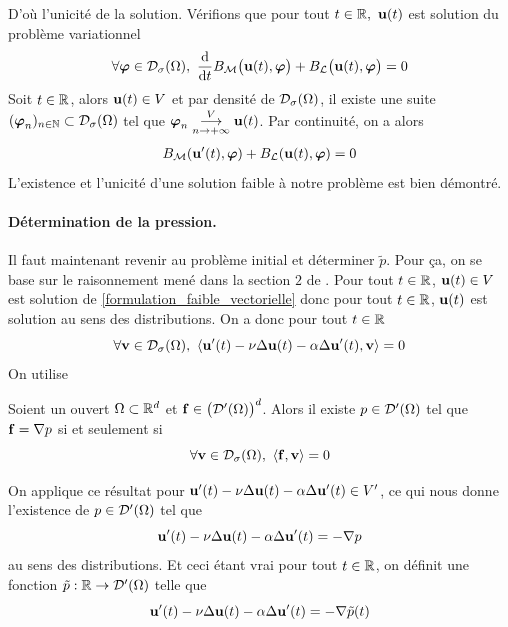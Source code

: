 D'où l'unicité de la solution. Vérifions que pour tout $t \in \mathbb{R},\ \bm{\mathrm{u}}(t)$ est solution du problème variationnel
\begin{eqnarray*}
    \forall \bfm{\varphi} \in \calD_{\sigma}(\Omega),\ \frac{\mathrm{d}}{\mathrm{d}t}B_{\calM}\big(\bfm{u}(t),\bfm{\varphi}\big) + B_{\calL}\big(\bfm{u}(t),\bfm{\varphi}\big) = 0
\end{eqnarray*}
Soit $t\in\mathbb{R}$, alors $\bm{\mathrm{u}}(t) \in V$ et par densité de $\mathcal{D}_{\sigma}(\Omega)$, il existe une suite $(\bm{\mathrm{\varphi}}_n)_{n\in \mathbb{N}} \subset \mathcal{D}_{\sigma}(\Omega)$ tel que $\bfm{\varphi}_n \overunderset{V}{n\rightarrow + \infty}\longrightarrow \bfm{u}(t)$. Par continuité, on a alors
\begin{eqnarray*}
    B_{\mathcal{M}}(\bm{\mathrm{u}}'(t), \bm{\mathrm{\varphi}}) + B_{\mathcal{L}}(\bm{\mathrm{u}}(t), \bm{\mathrm{\varphi}}) = 0
\end{eqnarray*}
L'existence et l'unicité d'une solution faible à notre problème 
est bien démontré.
\paragraph{Détermination de la pression.} Il faut maintenant revenir au problème initial et déterminer $\tilde{p}$. Pour ça, on se base sur le raisonnement mené dans la section $2$ de \cite{Temam1977}. Pour tout $t \in \mathbb{R}$, $\bm{\mathrm{u}}(t) \in V$ est solution de \eqref{formulation_faible_vectorielle} donc pour tout $t \in \mathbb{R}$, $\bm{\mathrm{u}}(t)$ est solution au sens des distributions. On a donc pour tout $t \in \mathbb{R}$
\begin{equation*}
    \forall \bm{\mathrm{v}} \in \mathcal{D}_{\sigma}(\Omega), \ \langle \bm{\mathrm{u}}'(t) - \nu \Delta \bm{\mathrm{u}}(t) - \alpha \Delta \bm{\mathrm{u}}'(t), \bm{\mathrm{v}} \rangle = 0
\end{equation*}
On utilise 
\begin{proposition}\label{lemme_De_Rham}
    Soient un ouvert $\Omega \subset \mathbb{R}^d$ et $\bm{\mathrm{f}} \in \big(\mathcal{D}'(\Omega)\big)^d$. Alors il existe 
    $p \in \mathcal{D}'(\Omega)$ tel que $\bm{\mathrm{f}} = \nabla p$ si et seulement si 
    \begin{equation*}
        \forall \bm{\mathrm{v}} \in \mathcal{D}_{\sigma}(\Omega), \ \langle \bm{\mathrm{f}}, \bm{\mathrm{v}} \rangle =0
    \end{equation*}
\end{proposition}
On applique ce résultat pour $\bm{\mathrm{u}}'(t) - \nu \Delta \bm{\mathrm{u}}(t) - \alpha \Delta\bm{\mathrm{u}}'(t) \in V'$, ce qui nous donne l'existence de $p \in \mathcal{D}'(\Omega)$ tel que 
\begin{equation*}
    \bm{\mathrm{u}}'(t) - \nu \Delta \bm{\mathrm{u}}(t) - \alpha\Delta \bm{\mathrm{u}}'(t) = -\nabla p
\end{equation*}
au sens des distributions. Et ceci étant vrai pour tout $t \in \mathbb{R}$, on définit une fonction $\tilde{p}:\mathbb{R} \rightarrow \mathcal{D}'(\Omega)$ telle que 
\begin{equation*}
    \bm{\mathrm{u}}'(t) - \nu \Delta \bm{\mathrm{u}}(t) - \alpha\Delta \bm{\mathrm{u}}'(t) = -\nabla \tilde{p}(t)
\end{equation*}

